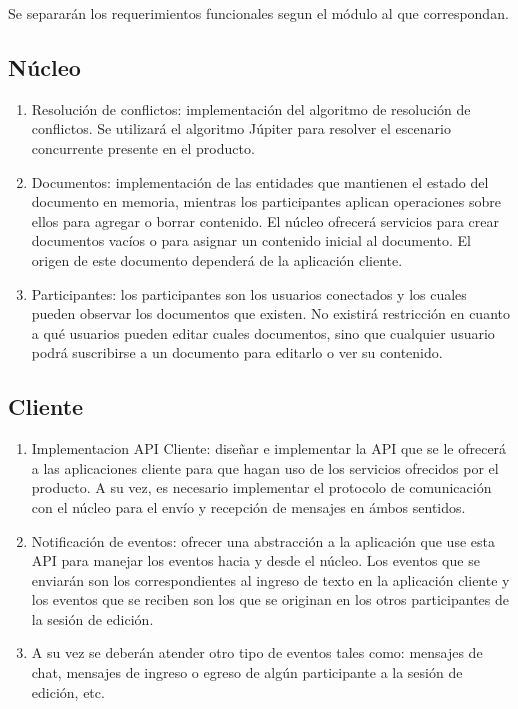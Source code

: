\documentclass[12pt,a4paper]{article}
\begin{document}
	Se separarán los requerimientos funcionales segun el módulo al que correspondan.

	\subsection{Núcleo}
	\begin{enumerate}
	\item Resolución de conflictos: implementación del algoritmo de resolución de conflictos. Se utilizará el algoritmo Júpiter \cite{jupiter} para resolver el escenario concurrente presente en el producto.
	\item Documentos: implementación de las entidades que mantienen el estado del documento en memoria, mientras los participantes aplican operaciones sobre ellos para agregar o borrar contenido. El núcleo ofrecerá servicios para crear documentos vacíos o para asignar un contenido inicial al documento. El origen de este documento dependerá de la aplicación cliente.
	\item Participantes: los participantes son los usuarios conectados y los cuales pueden observar los documentos que existen. No existirá restricción en cuanto a qué usuarios pueden editar cuales documentos, sino que cualquier usuario podrá suscribirse a un documento para editarlo o ver su contenido.
	
	\end{enumerate}


	\subsection{Cliente}

	\begin{enumerate}
\item Implementacion API Cliente: diseñar e implementar la API que se le ofrecerá a las aplicaciones cliente para que hagan uso de los servicios ofrecidos por el producto.
A su vez, es necesario implementar el protocolo de comunicación con el núcleo para el envío y recepción de mensajes en ámbos sentidos.

\item Notificación de eventos: ofrecer una abstracción a la aplicación que use esta API para manejar los eventos hacia y desde el núcleo. Los eventos que se enviarán son los correspondientes al ingreso de texto en la aplicación cliente y los eventos que se reciben son los que se originan en los otros participantes de la sesión de edición.

\item A su vez se deberán atender otro tipo de eventos tales como: mensajes de chat, mensajes de ingreso o egreso de algún participante a la sesión de edición, etc.
	\end{enumerate}
\end{document}
